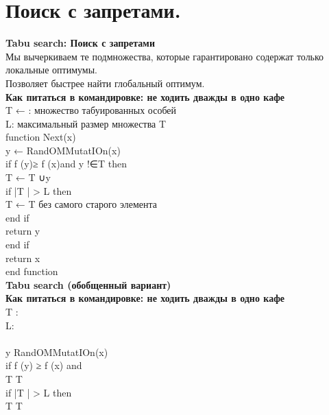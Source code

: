 \newcommand\tab[1][1cm]{\hspace*{#1}}
\section{Поиск с запретами.}
\textbf{Tabu search: Поиск с запретами}\\
Мы вычеркиваем те подмножества, которые гарантировано содержат только локальные оптимумы.\\
Позволяет быстрее найти глобальный оптимум.\\ 

\textbf{Как питаться в командировке: не ходить дважды в одно кафе}\\
T ← {}: множество табуированных особей  \\
L: максимальный размер множества T  \\
function Next(x)  \\
\tab y ← RandOMMutatIOn(x)  \\
\tab if f (y)≥ f (x)and y !∈T then  \\
\tab \tab T ← T ∪{y}  \\
\tab \tab if |T | > L then  \\
\tab \tab \tab T ← T без самого старого элемента  \\
\tab \tab end if  \\
\tab \tab return y  \\
\tab end if  \\
\tab return x  \\
end function \\

\textbf{Tabu search (обобщенный вариант)}\\
\textbf{Как питаться в командировке: не ходить дважды в одно кафе}\\
T \leftarrow \lbrace \rbrace:  \\
L:  \\
  \\
\tab y \leftarrow RandOMMutatIOn(x)  \\
\tab if f (y) ≥ f (x) and   \\
\tab \tab T \leftarrow T   \\
\tab \tab if |T | > L then  \\
\tab \tab \tab T \leftarrow T   \\
\tab \tab {}  \\
\tab \tab {}  \\
\tab {}  \\
\tab {}  \\
 \\

